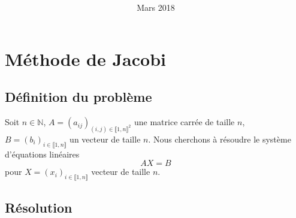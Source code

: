 \documentclass[11pt, a4paper]{article}
\title{
\LARGE{\textbf{\hmwkClass}}\\
\vspace{0.5in}
\large{\textbf{\hmwkTitle}}
\vspace{3in}
}
\author{\textbf{\hmwkAuthorName}}
\date{Mars 2018} %
\begin{document}
\maketitle



\newpage
\tableofcontents
\newpage



\section{Méthode de Jacobi}

\subsection{Définition du problème}

Soit $n \in \mathds{N}$, $A = (a_{ij})_{(i,j)\in \llbracket 1,n \rrbracket^2}$ une matrice carrée de taille $n$, $B = (b_{i})_{i\in \llbracket 1,n \rrbracket}$ un vecteur de taille $n$.
Nous cherchons à résoudre le système d'équations linéaires
\begin{equation} \label{eq:problem}
    AX=B
\end{equation}
pour $X = (x_{i})_{i\in \llbracket 1,n \rrbracket}$ vecteur de taille $n$.

\subsection{Résolution}
\end{document}
